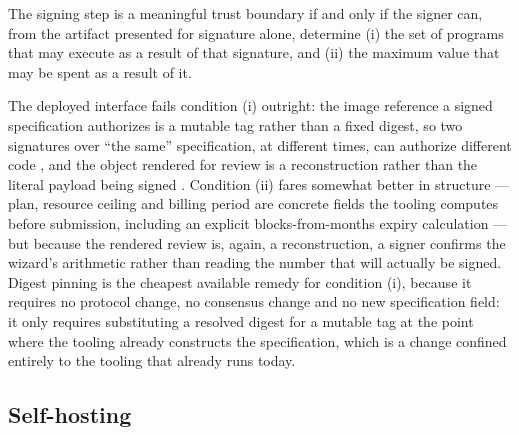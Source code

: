 \begin{property}
The signing step is a meaningful trust boundary if and only if the signer can, from the
artifact presented for signature alone, determine (i) the set of programs that may
execute as a result of that signature, and (ii) the maximum value that may be spent as a
result of it.
\end{property}

The deployed interface fails condition (i) outright: the image reference a signed
specification authorizes is a mutable tag rather than a fixed digest, so two signatures
over ``the same'' specification, at different times, can authorize different code
\shipped {}, and
the object rendered for review is a reconstruction rather than the literal payload being
signed \shipped {}.
Condition (ii) fares somewhat better in structure — plan, resource ceiling and billing
period are concrete fields the tooling computes before submission, including an explicit
blocks-from-months expiry calculation \shipped
{} — but
because the rendered review is, again, a reconstruction, a signer confirms the wizard's
arithmetic rather than reading the number that will actually be signed. Digest pinning
is the cheapest available remedy for condition (i), because it requires no protocol
change, no consensus change and no new specification field: it only requires
substituting a resolved digest for a mutable tag at the point where the tooling already
constructs the specification, which is a change confined entirely to the tooling that
already runs today.

\subsection{Self-hosting}

